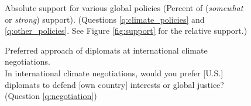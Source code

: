 \begin{figure}[h!] %
    \caption[Absolute support for various global policies]{Absolute support for various global policies (Percent of (\textit{somewhat} or \textit{strong}) support). (Questions \ref{q:climate_policies} and \ref{q:other_policies}. See Figure \ref{fig:support} for the relative support.)}\label{fig:support_likert_positive}
\end{figure}



\begin{figure}[h!]
    \caption[Preferred approach for international climate negotiations]{Preferred approach of diplomats at international climate negotiations. \\ In international climate negotiations, would you prefer [U.S.] diplomats to defend [own country] interests or global justice? (Question \ref{q:negotiation})}\label{fig:negotiation}
\end{figure}

